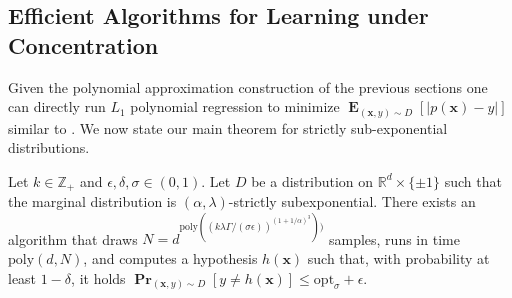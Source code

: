 \documentclass{theoretics}
\renewcommand\vec[1]{\mathbf{#1}}
\DeclareMathOperator*{\pr}{\mathbf{Pr}}
\DeclareMathOperator*{\E}{\mathbf{E}}
\newcommand{\R}{\mathbb{R}}
\newcommand{\eps}{\epsilon}
\newcommand{\poly}{\mathrm{poly}}
\newcommand{\opt}{\mathrm{opt}}
\newcommand{\1}{\Ind}
\newcommand{\x}{\vec x}
\newcommand{\Djoint}{D}
\begin{document}
\subsection{Efficient Algorithms for Learning under Concentration}
\label{sec:efficient-algorithms}

Given the polynomial approximation construction of the previous sections one can directly
run $L_1$ polynomial regression to minimize $\E_{(\x, y)\sim D}[ |p(\x) - y|]$ similar to \cite{KKMS:05}.
We now state our main theorem for strictly sub-exponential distributions.
\begin{theorem}
\label{thm:smooth_learning_subgaussian-main}
    Let $k \in \mathbb Z_+$ and $\epsilon, \delta,\sigma \in (0,1)$.  Let $D$ be a distribution on $\R^{d}\times \{\pm 1\}$ such that the marginal distribution is $(\alpha,\lambda)$-strictly subexponential. There exists an algorithm that draws $N = d^{\poly((k\lambda\Gamma/(\sigma\epsilon))^{(1+1/\alpha)^3}))}$ samples, runs in time $\poly(d,N)$, and computes a hypothesis $h(\x)$ such that, with probability at least $1-\delta$, it holds  
    $ \pr_{(\x, y) \sim \Djoint}[y\neq h(\x)] \le \opt_\sigma + \eps  $.
\end{theorem}
\end{document}
